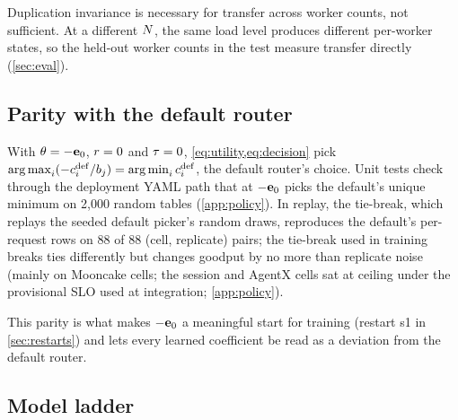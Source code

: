 Duplication invariance is necessary for transfer across worker counts, not sufficient. At a
different $N$, the same load level produces different per-worker states, so the held-out worker
counts in the test measure transfer directly (\cref{sec:eval}).

\subsection{Parity with the default router}
\label{sec:parity}

With $\theta = -\mathbf{e}_{0}$, $r = 0$ and $\tau = 0$, \cref{eq:utility,eq:decision} pick
$\operatorname*{arg\,max}_i (-c^{\mathrm{def}}_i/b_j) = \operatorname*{arg\,min}_i c^{\mathrm{def}}_i$, the default router's choice. Unit tests
check through the deployment YAML path that \lc{} at $-\mathbf{e}_{0}$ picks the default's unique
minimum on 2,000 random tables (\cref{app:policy}).
In replay, the  tie-break, which replays the seeded default picker's random draws,
reproduces the default's per-request rows on 88 of 88 (cell, replicate) pairs; the
 tie-break used in training breaks ties differently but changes goodput by no more
than replicate noise (mainly on Mooncake cells; the session and AgentX cells sat at ceiling under the
provisional SLO used at integration; \cref{app:policy}).

This parity is what makes $-\mathbf{e}_{0}$ a meaningful start for training (restart s1 in
\cref{sec:restarts}) and lets every learned coefficient be read as a deviation from the default
router.

\subsection{Model ladder}
\label{sec:ladder}

